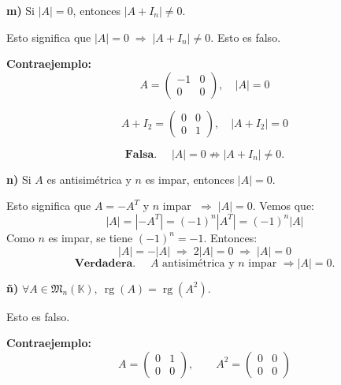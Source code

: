 \documentclass[a4paper,12pt]{article}
\begin{document}
\begin{ejercicio}[title=Ejercicio 42 (⋆)]
\textbf{m)} Si $|A| = 0$, entonces $|A + I_n| \ne 0$.

\vspace{0.5em}

Esto significa que $|A| = 0 \;\Rightarrow\; |A + I_n| \ne 0$.  
Esto es falso.

\vspace{0.5em}

\textbf{Contraejemplo:}
\[
A = \begin{pmatrix}-1 & 0 \\ 0 & 0\end{pmatrix}, \quad |A| = 0
\]

\[
A + I_2 = \begin{pmatrix}0 & 0 \\ 0 & 1\end{pmatrix}, \quad |A + I_2| = 0
\]

\[
\boxed{\textbf{Falsa. }\quad |A| = 0 \not\Rightarrow |A + I_n| \ne 0.}
\]

\vspace{1em}

\textbf{n)} Si $A$ es antisimétrica y $n$ es impar, entonces $|A| = 0$.

\vspace{0.5em}

Esto significa que $A = -A^T$ y $n$ impar $\;\Rightarrow\; |A| = 0$.  
Vemos que:
\[
|A| = |-A^T| = (-1)^n |A^T| = (-1)^n |A|
\]
Como $n$ es impar, se tiene $(-1)^n = -1$. Entonces:
\[
|A| = -|A| \;\Rightarrow\; 2|A| = 0 \;\Rightarrow\; |A| = 0
\]
\[
\boxed{\textbf{Verdadera. }\quad A \text{ antisimétrica y } n \text{ impar } \Rightarrow |A| = 0.}
\]

\vspace{1em}

\textbf{ñ)} $\forall A \in \mathfrak{M}_n(\mathbb{K}),\ \operatorname{rg}(A) = \operatorname{rg}(A^2)$.

\vspace{0.5em}

Esto es falso.

\vspace{0.5em}

\textbf{Contraejemplo:}
\[
A = \begin{pmatrix}
0 & 1\\
0 & 0
\end{pmatrix}, \qquad
A^2 = \begin{pmatrix}
0 & 0\\
0 & 0
\end{pmatrix}
\]


\end{ejercicio}
\end{document}
